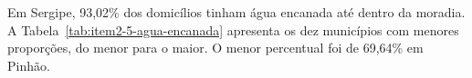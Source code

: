 Em Sergipe, 93,02\% dos domicílios tinham água encanada até dentro da moradia. A Tabela~\ref{tab:item2-5-agua-encanada} apresenta os dez municípios com menores proporções, do menor para o maior. O menor percentual foi de 69,64\% em Pinhão.
